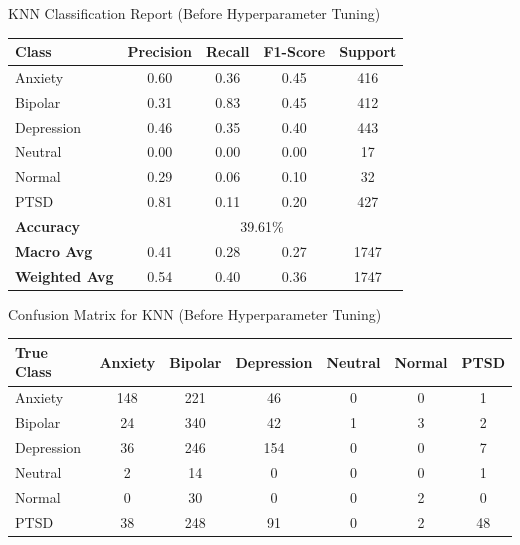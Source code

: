 \begin{center}
    \caption{KNN Classification Report (Before Hyperparameter Tuning)}
\begin{tabular}{|l|c|c|c|c|}
\hline
\textbf{Class} & \textbf{Precision} & \textbf{Recall} & \textbf{F1-Score} & \textbf{Support} \\ \hline
Anxiety        & 0.60               & 0.36            & 0.45              & 416              \\ \hline
Bipolar        & 0.31               & 0.83            & 0.45              & 412              \\ \hline
Depression     & 0.46               & 0.35            & 0.40              & 443              \\ \hline
Neutral        & 0.00               & 0.00            & 0.00              & 17               \\ \hline
Normal         & 0.29               & 0.06            & 0.10              & 32               \\ \hline
PTSD           & 0.81               & 0.11            & 0.20              & 427              \\ \hline
\textbf{Accuracy} & \multicolumn{4}{|c|}{39.61\%} \\ \hline
\textbf{Macro Avg} & 0.41            & 0.28            & 0.27              & 1747             \\ \hline
\textbf{Weighted Avg} & 0.54         & 0.40            & 0.36              & 1747             \\ \hline
\end{tabular}


\vspace{0.25in}

\caption{Confusion Matrix for KNN (Before Hyperparameter Tuning)}
\begin{tabular}{|l|c|c|c|c|c|c|}
\hline
\textbf{True Class} & \textbf{Anxiety} & \textbf{Bipolar} & \textbf{Depression} & \textbf{Neutral} & \textbf{Normal} & \textbf{PTSD} \\ \hline
Anxiety             & 148              & 221              & 46                  & 0                & 0               & 1             \\ \hline
Bipolar             & 24               & 340              & 42                  & 1                & 3               & 2             \\ \hline
Depression          & 36               & 246              & 154                 & 0                & 0               & 7             \\ \hline
Neutral             & 2                & 14               & 0                   & 0                & 0               & 1             \\ \hline
Normal              & 0                & 30               & 0                   & 0                & 2               & 0             \\ \hline
PTSD                & 38               & 248              & 91                  & 0                & 2               & 48            \\ \hline
\end{tabular}



\end{center}
